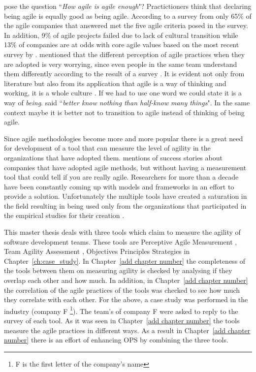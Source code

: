 \citet{comparative_agility} pose the question ``\textit{How agile is agile enough}"? Practictioners think that declaring being agile is equally good as being agile. According to a survey from \citet{ambysoft} only 65\% of the agile companies that answered met the five agile criteria posed in the survey. In addition, 9\% of agile projects failed due to lack of cultural transition while 13\% of companies are at odds with core agile values based on the most recent survey by \citet{versionOne}. \citet{poonacha} mentioned that the different perception of agile practices when they are adopted is very worrying, since even people in the same team understand them differently according to the result of a survey \cite{ambler}. It is evident not only from literature but also from its application that agile is a way of thinking and working, it is a whole culture \cite{poonacha}. If we had to use one word we could state it is a way of \textit{being}. \citet{Nietzsche} said ``\textit{better know nothing than half-know many things}". In the same context maybe it is better not to transition to agile instead of thinking of being agile. 

Since agile methodologies become more and more popular there is a great need for development of a tool that can measure the level of agility in the organizations that have adopted them. \citet{sidky} mentions of success stories about companies that have adopted agile methods, but without having a measurement tool that could tell if you are really agile. Researchers for more than a decade have been constantly coming up with models and frameworks in an effort to provide a solution. Unfortunately the multiple tools have created a saturation in the field resulting in being used only from the organizations that participated in the empirical studies for their creation \cite{samireh_jalali_dissertation}\cite{Jalali2014}. %

This master thesis deals with three tools which claim to measure the agility of software development teams. These tools are Perceptive Agile Measurement \cite{pam}, Team Agility Assessment \cite{Leffingwell}, Objectives Principles Strategies \cite{sventha_dissertation} in Chapter~\ref{ch:case_study}. In Chapter~\ref{add chapter number} the completeness of the tools between them on measuring agility is checked by analysing if they overlap each other and how much. In addition, in Chapter~\ref{add chapter number} the correlation of the agile practices of the tools was checked to see how much they correlate with each other. For the above, a case study was performed in the industry (company F \footnote{F is the first letter of the company's name}). The team's of company F were asked to reply to the survey of each tool. As it was seen in Chapter~\ref{add chapter number} the tools measure the agile practices in different ways. As a result in Chapter~\ref{add chapter number} there is an effort of enhancing OPS by combining the three tools.


